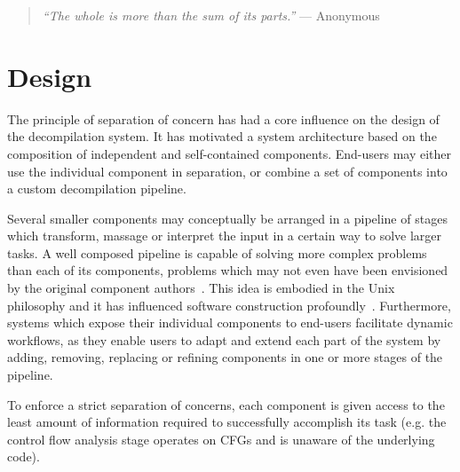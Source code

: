 
%


\begin{quote}
	\textit{``The whole is more than the sum of its parts.''} --- Anonymous
\end{quote}

\section{Design}
\label{sec:design}

The principle of separation of concern has had a core influence on the design of the decompilation system. It has motivated a system architecture based on the composition of independent and self-contained components. End-users may either use the individual component in separation, or combine a set of components into a custom decompilation pipeline.

Several smaller components may conceptually be arranged in a pipeline of stages which transform, massage or interpret the input in a certain way to solve larger tasks. A well composed pipeline is capable of solving more complex problems than each of its components, problems which may not even have been envisioned by the original component authors~\cite{simplicity_and_collaboration}. This idea is embodied in the Unix philosophy and it has influenced software construction profoundly~\cite{art_of_unix}. Furthermore, systems which expose their individual components to end-users facilitate dynamic workflows, as they enable users to adapt and extend each part of the system by adding, removing, replacing or refining components in one or more stages of the pipeline.

To enforce a strict separation of concerns, each component is given access to the least amount of information required to successfully accomplish its task (e.g. the control flow analysis stage operates on CFGs and is unaware of the underlying code).


